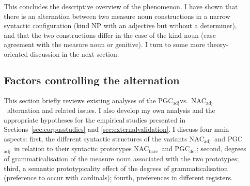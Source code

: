 \documentclass[USenglish]{article}
\newcommand{\Sub}[1]{\ensuremath{\mathrm{_{#1}}}}
\newcommand{\NACb}{NAC\Sub{bare}}
\newcommand{\NACa}{NAC\Sub{adj}}
\newcommand{\PGCd}{PGC\Sub{det}}
\newcommand{\PGCa}{PGC\Sub{adj}}
\begin{document}
This concludes the descriptive overview of the phenomenon.
I have shown that there is an alternation between two measure noun constructions in a narrow syntactic configuration (kind NP with an adjective but without a determiner), and that the two constructions differ in the case of the kind noun (case agreement with the measure noun or genitive).
I turn to some more theory-oriented discussion in the next section.



\subsection{Factors controlling the alternation}
\label{sec:analyses}

This section briefly reviews existing analyses of the \PGCa vs.\ \NACa\ alternation and related issues.
I also develop my own analysis and the appropriate hypotheses for the empirical studies presented in Sections~\ref{sec:corpusstudies} and \ref{sec:externalvalidation}.
I discuss four main aspects:
first, the different syntactic structures of the variants \NACa\ and \PGCa\ in relation to their syntactic prototypes \NACb\ and \PGCd;
second, degrees of grammaticalisation of the measure noun associated with the two prototypes;
third, a semantic prototypicality effect of the degrees of grammaticalisation (preference to occur with cardinals);
fourth, preferences in different registers.

\end{document}
